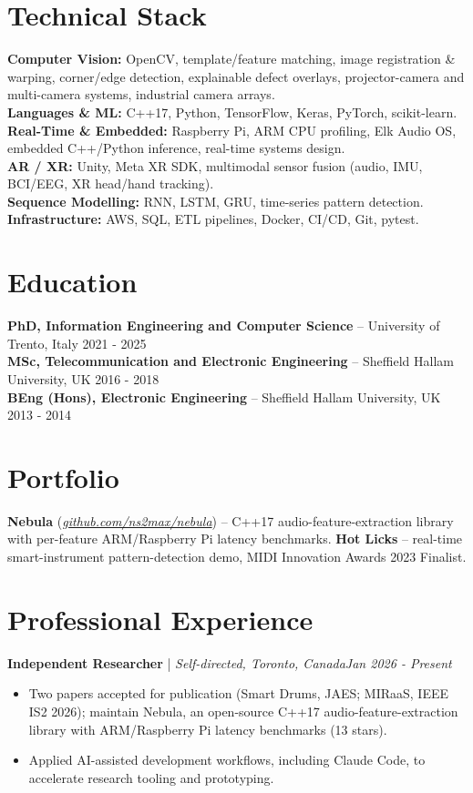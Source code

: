 \documentclass[11pt]{article}
\newenvironment{cvrole}[5]{%
  \par\noindent\textbf{\large #1} | \textit{\small #2, #3}\hfill \textit{\small #4 - #5}\par
  \begin{itemize}[leftmargin=2em, itemsep=-0.3em, topsep=-0.5em]%
}{%
  \end{itemize}\par\noindent\mbox{}\par\vspace{0.1em}%
}
\begin{document}
\section*{Technical Stack}
\textbf{Computer Vision:} OpenCV, template/feature matching, image registration \& warping, corner/edge detection, explainable defect overlays, projector-camera and multi-camera systems, industrial camera arrays. \\
\textbf{Languages \& ML:} C++17, Python, TensorFlow, Keras, PyTorch, scikit-learn. \\
\textbf{Real-Time \& Embedded:} Raspberry Pi, ARM CPU profiling, Elk Audio OS, embedded C++/Python inference, real-time systems design. \\
\textbf{AR / XR:} Unity, Meta XR SDK, multimodal sensor fusion (audio, IMU, BCI/EEG, XR head/hand tracking). \\
\textbf{Sequence Modelling:} RNN, LSTM, GRU, time-series pattern detection. \\
\textbf{Infrastructure:} AWS, SQL, ETL pipelines, Docker, CI/CD, Git, pytest.

\section*{Education}
\textbf{PhD, Information Engineering and Computer Science} -- University of Trento, Italy \hfill 2021 - 2025 \\
\textbf{MSc, Telecommunication and Electronic Engineering} -- Sheffield Hallam University, UK \hfill 2016 - 2018 \\
\textbf{BEng (Hons), Electronic Engineering} -- Sheffield Hallam University, UK \hfill 2013 - 2014

\section*{Portfolio}
\textbf{Nebula} (\href{https://github.com/ns2max/nebula}{\textit{github.com/ns2max/nebula}}) -- C++17 audio-feature-extraction library with per-feature ARM/Raspberry Pi latency benchmarks. \textbf{Hot Licks} -- real-time smart-instrument pattern-detection demo, MIDI Innovation Awards 2023 Finalist.

\section*{Professional Experience}

\begin{cvrole}{Independent Researcher}{Self-directed}{Toronto, Canada}{Jan 2026}{Present}
    \item Two papers accepted for publication (Smart Drums, JAES; MIRaaS, IEEE IS2 2026); maintain Nebula, an open-source C++17 audio-feature-extraction library with ARM/Raspberry Pi latency benchmarks (13 stars).
    \item Applied AI-assisted development workflows, including Claude Code, to accelerate research tooling and prototyping.
\end{cvrole}
\end{document}

